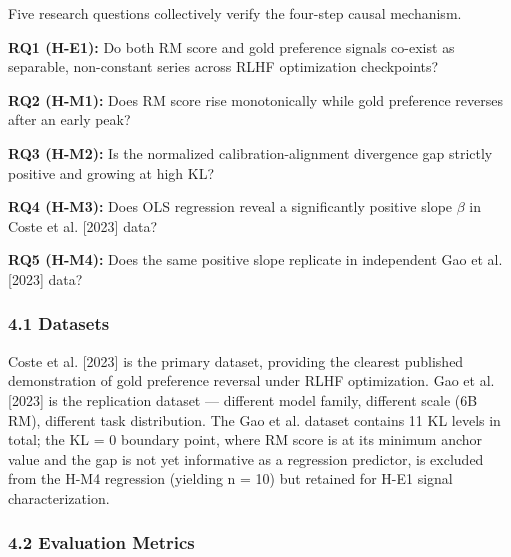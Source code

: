 
Five research questions collectively verify the four-step causal mechanism.

\textbf{RQ1 (H-E1):} Do both RM score and gold preference signals co-exist as separable, non-constant series across RLHF optimization checkpoints?

\textbf{RQ2 (H-M1):} Does RM score rise monotonically while gold preference reverses after an early peak?

\textbf{RQ3 (H-M2):} Is the normalized calibration-alignment divergence gap strictly positive and growing at high KL?

\textbf{RQ4 (H-M3):} Does OLS regression reveal a significantly positive slope $\beta$ in Coste et al. [2023] data?

\textbf{RQ5 (H-M4):} Does the same positive slope replicate in independent Gao et al. [2023] data?

\subsubsection{4.1 Datasets}

\begin{table}[htbp]
\centering
{}
\end{table}

Coste et al. [2023] is the primary dataset, providing the clearest published demonstration of gold preference reversal under RLHF optimization. Gao et al. [2023] is the replication dataset --- different model family, different scale (6B RM), different task distribution. The Gao et al. dataset contains 11 KL levels in total; the KL = 0 boundary point, where RM score is at its minimum anchor value and the gap is not yet informative as a regression predictor, is excluded from the H-M4 regression (yielding n = 10) but retained for H-E1 signal characterization.

\subsubsection{4.2 Evaluation Metrics}

